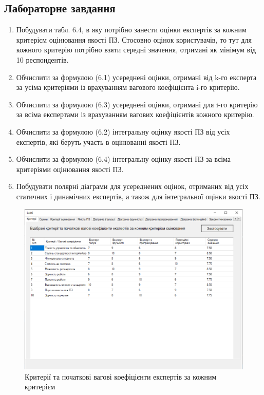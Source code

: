 \documentclass[14pt]{extreport}
\begin{document}
\begin{normalsize}
	\section*{Лабораторне завдання}
	\begin{enumerate}
		\item Побудувати табл. 6.4, в яку потрібно занести оцінки експертів за кожним
		критерієм оцінювання якості ПЗ. Стосовно оцінок користувачів, то тут для кожного
		критерію потрібно взяти середні значення, отримані як мінімум від 10 респондентів.
		\item Обчислити за формулою (6.1) усереднені оцінки, отримані від k-го
		експерта за усіма критеріями із врахуванням вагового коефіцієнта i-го критерію.
		\item Обчислити за формулою (6.3) усереднені оцінки, отримані для i-го
		критерію за всіма експертами із врахуванням вагових коефіцієнтів кожного критерію.
		\item Обчислити за формулою (6.2) інтегральну оцінку якості ПЗ від усіх
		експертів, які беруть участь в оцінюванні якості ПЗ.
		\item Обчислити за формулою (6.4) інтегральну оцінку якості ПЗ за всіма
		критеріями оцінювання якості ПЗ.
		\item Побудувати полярні діаграми для усереднених оцінок, отриманих від усіх
		статичних і динамічних експертів, а також для інтегральної оцінки якості ПЗ.
	\end{enumerate}
	
	\begin{figure}[H]
		\centering
		\includegraphics[scale=0.55]{1}
		\caption{Критерії та початкові вагові коефіцієнти експертів за кожним критерієм}
	\end{figure}


\end{normalsize}
\end{document}
